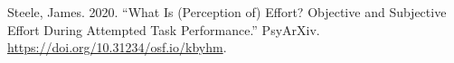 \documentclass[
  letterpaper,
  DIV=11,
  numbers=noendperiod]{scrartcl}
\newlength{\cslhangindent}
\newlength{\cslentryspacingunit} %
\newenvironment{CSLReferences}[2] %
 {%
  \setlength{\parindent}{0pt}
  \ifodd #1
  \let\oldpar\par
  \def\par{\hangindent=\cslhangindent\oldpar}
  \fi
  \setlength{\parskip}{#2\cslentryspacingunit}
 }%
 {}
\begin{document}
\hypertarget{refs}{}
\begin{CSLReferences}{1}{0}
\leavevmode{}%
Steele, James. 2020. {``What Is (Perception of) Effort? {Objective} and
Subjective Effort During Attempted Task Performance.''} PsyArXiv.
\url{https://doi.org/10.31234/osf.io/kbyhm}.

\end{CSLReferences}
\end{document}
